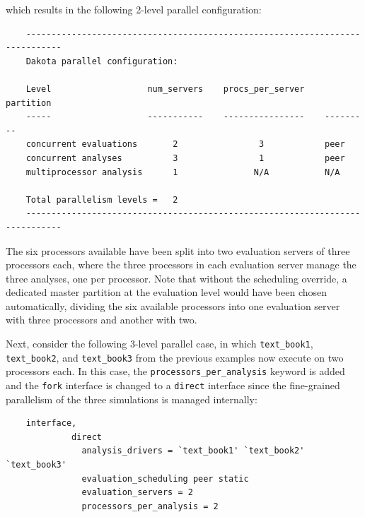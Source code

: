 which results in the following 2-level parallel configuration:
\begin{small}
\begin{verbatim}
    -----------------------------------------------------------------------------
    Dakota parallel configuration:

    Level                   num_servers    procs_per_server    partition
    -----                   -----------    ----------------    ---------
    concurrent evaluations       2                3            peer
    concurrent analyses          3                1            peer
    multiprocessor analysis      1               N/A           N/A

    Total parallelism levels =   2
    -----------------------------------------------------------------------------
\end{verbatim}
\end{small}

The six processors available have been split into two evaluation
servers of three processors each, where the three processors in each
evaluation server manage the three analyses, one per processor. Note that
without the scheduling override, a dedicated master partition at the 
evaluation level would have been chosen automatically, dividing
the six available processors into one evaluation server with three 
processors and another with two.

Next, consider the following 3-level parallel case, in which
\texttt{text\_book1}, \texttt{text\_book2}, and \texttt{text\_book3}
from the previous examples now execute on two processors each. In this
case, the \texttt{processors\_per\_analysis} keyword is added and the
\texttt{fork} interface is changed to a \texttt{direct} interface
since the fine-grained parallelism of the three simulations is managed
internally:
\begin{small}
\begin{verbatim}
    interface,
             direct
               analysis_drivers = `text_book1' `text_book2' `text_book3'
               evaluation_scheduling peer static
               evaluation_servers = 2
               processors_per_analysis = 2
\end{verbatim}
\end{small}

